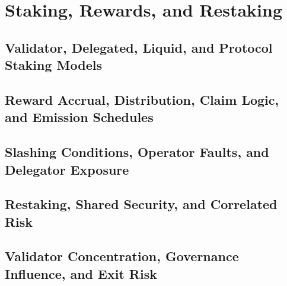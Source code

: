 \chapter{Staking, Rewards, and Restaking}

\section{Validator, Delegated, Liquid, and Protocol Staking Models}

\section{Reward Accrual, Distribution, Claim Logic, and Emission Schedules}

\section{Slashing Conditions, Operator Faults, and Delegator Exposure}

\section{Restaking, Shared Security, and Correlated Risk}

\section{Validator Concentration, Governance Influence, and Exit Risk}
